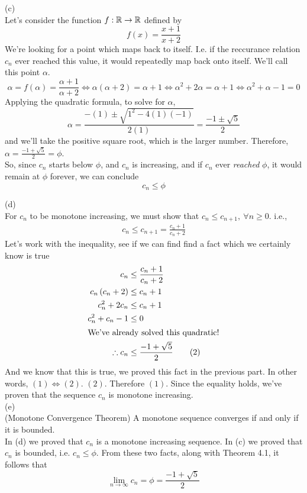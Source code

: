 \documentclass[a4paper,12pt]{report}
\begin{document}
\newpage
\sol (c) \\
Let's consider the function $f:\mathbb{R}\to\mathbb{R}$ defined by
$$
	f(x) = \frac{x+1}{x+2}
$$
We're looking for a point which maps back to itself. I.e. if the reccurance relation $c_n$ ever reached this value, it would repeatedly map back onto itself. We'll call this point $\alpha$.
$$
	\alpha = f(\alpha) = \frac{\alpha + 1}{\alpha + 2} \iff \alpha(\alpha+2) = \alpha + 1 \iff \alpha^2 + 2\alpha = \alpha + 1 \iff \alpha^2 + \alpha - 1 = 0
$$
Applying the quadratic formula, to solve for $\alpha$,
$$
	\alpha = \frac{-(1)\pm\sqrt{1^2 - 4(1)(-1)}}{2(1)} = \frac{-1 \pm \sqrt{5}}{2}
$$
and we'll take the positive square root, which is the larger number. Therefore, $\alpha = \frac{-1+\sqrt{5}}{2} = \phi$. \\

So, since $c_n$ starts below $\phi$, and $c_n$ is increasing, and if $c_n$ ever \textit{reached} $\phi$, it would remain at $\phi$ forever, we can conclude
$$
	c_n \leq \phi
$$

\sol (d) \\
For $c_n$ to be monotone increasing, we must show that $c_n\leq c_{n+1},\ \forall n\geq 0$. i.e.,
\begin{gather}
	c_n \leq c_{n+1} = \frac{c_n + 1}{c_n + 2} 
\end{gather}
Let's work with the inequality, see if we can find find a fact which we certainly know is true
\begin{align*}
	c_n &\leq \frac{c_n + 1}{c_n + 2} \\
	c_n\left( c_n + 2 \right) &\leq c_n + 1 \\
	c_n^2 + 2c_n &\leq c_n + 1 \\
	c_n^2 + c_n - 1 &\leq 0 \\
	\intertext{We've already solved this quadratic!}
	\therefore c_n &\leq \frac{-1+\sqrt{5}}{2} \tag*{(2)}
\end{align*}
And we know that this is true, we proved this fact in the previous part. In other words, $(1)\iff (2)$. $(2)$. Therefore $(1)$.	Since the equality holds, we've proven that the sequence $c_n$ is monotone increasing. \\

\sol (e) \\
 (Monotone Convergence Theorem)	A monotone sequence converges if and only if it is bounded. \\

In (d) we proved that $c_n$ is a monotone increasing sequence. In (c) we proved that $c_n$ is bounded, i.e. $c_n\leq\phi$. From these two facts, along with Theorem 4.1, it follows that
$$
	\lim_{n\to\infty} c_n = \phi = \frac{-1+\sqrt{5}}{2}
$$
\end{document}
